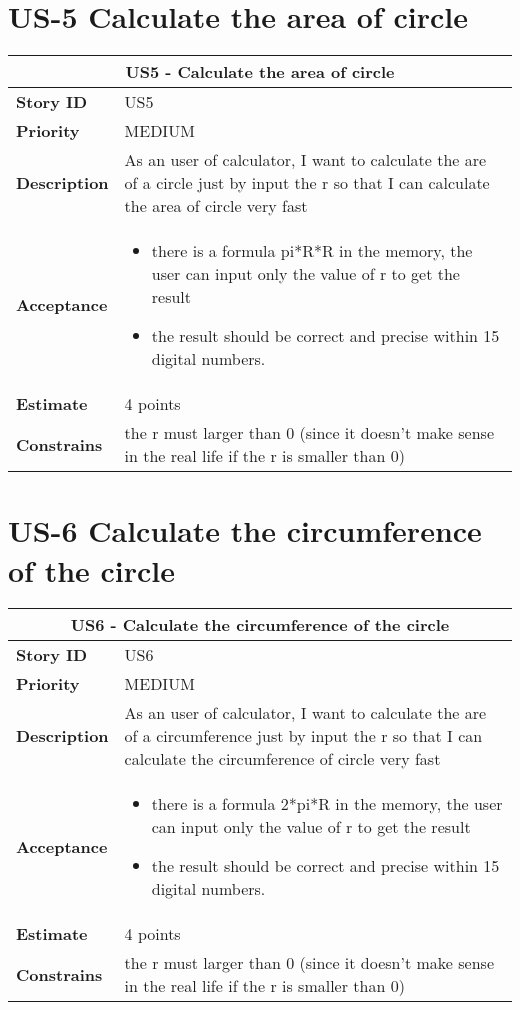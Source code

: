 \documentclass[12pt]{report}
\begin{document}
{\section{US-5 Calculate the area of circle }
\begin{tabular}{ |p{4cm}|p{10cm}| }
 \hline
 \multicolumn{2}{|c|}{US5 - Calculate the area of circle } \\
 \hline
 \textbf {Story ID}& US5  \\
 \hline
 \textbf{Priority} & MEDIUM \\
 \hline
  \textbf{Description}   & As an user of calculator, I want to calculate the are of a circle just by input the r so that I can calculate the area of circle very fast  \\
  \hline
  \textbf{Acceptance}& 
   \begin{itemize}
     \item  there is a formula pi*R*R in the memory, the user can input only the value of r to get the result 
     \item  the result should be correct and precise within 15 digital numbers.
\end{itemize}
  \\
 \hline
 \textbf{Estimate} & 4 points   \\
 \hline
 \textbf{Constrains}& the r must larger than 0 (since it doesn't make sense in the real life if the r is smaller than 0) \\
 \hline
\end{tabular}


\section{US-6 Calculate the circumference of the circle}
\begin{tabular}{ |p{4cm}|p{10cm}| }
 \hline
 \multicolumn{2}{|c|}{US6 - Calculate the circumference of the circle } \\
 \hline
 \textbf {Story ID}& US6 \\
 \hline
 \textbf{Priority} & MEDIUM \\
 \hline
  \textbf{Description}   & As an user of calculator, I want to calculate the are of a circumference just by input the r so that I can calculate the circumference of circle very fast  \\
  \hline
  \textbf{Acceptance}&
     \begin{itemize}
     \item  there is a formula 2*pi*R in the memory, the user can input only the value of r to get the result 
     \item  the result should be correct and precise within 15 digital numbers.
\end{itemize}
  \\
 \hline
 \textbf{Estimate} & 4 points\\
 \hline
 \textbf{Constrains}& the r must larger than 0 (since it doesn't make sense in the real life if the r is smaller than 0)   \\
 \hline
\end{tabular}

}
\end{document}
